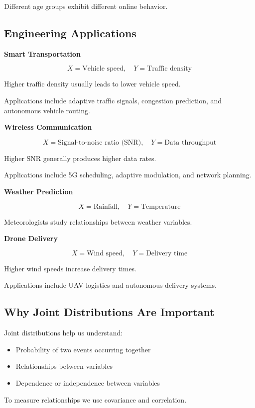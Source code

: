 \documentclass[12pt,a4paper]{article}
\begin{document}
Different age groups exhibit different online behavior.

\subsection{Engineering Applications}

\textbf{Smart Transportation}

\[
X = \text{Vehicle speed}, \quad Y = \text{Traffic density}
\]

Higher traffic density usually leads to lower vehicle speed.

Applications include adaptive traffic signals, congestion prediction, and autonomous vehicle routing.

\textbf{Wireless Communication}

\[
X = \text{Signal-to-noise ratio (SNR)}, \quad Y = \text{Data throughput}
\]

Higher SNR generally produces higher data rates.

Applications include 5G scheduling, adaptive modulation, and network planning.

\textbf{Weather Prediction}

\[
X = \text{Rainfall}, \quad Y = \text{Temperature}
\]

Meteorologists study relationships between weather variables.

\textbf{Drone Delivery}

\[
X = \text{Wind speed}, \quad Y = \text{Delivery time}
\]

Higher wind speeds increase delivery times.

Applications include UAV logistics and autonomous delivery systems.

\subsection{Why Joint Distributions Are Important}

Joint distributions help us understand:

\begin{itemize}
\item Probability of two events occurring together
\item Relationships between variables
\item Dependence or independence between variables
\end{itemize}

To measure relationships we use covariance and correlation.
\end{document}
